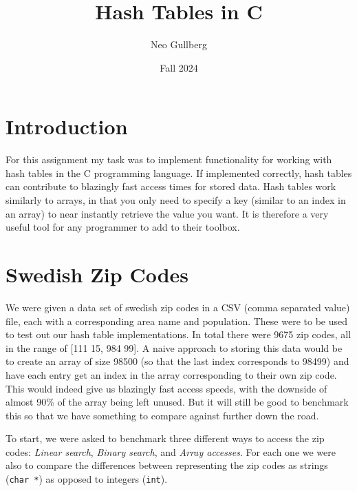 \documentclass[a4paper, 11pt]{article}
\begin{document}
\title{
	\textbf{Hash Tables in C}
}
\author{Neo Gullberg}
\date{Fall 2024}
\maketitle

\section{Introduction}
	For this assignment my task was to implement functionality for working with hash tables in the C programming language.
	If implemented correctly, hash tables can contribute to blazingly fast access times for stored data.
	Hash tables work similarly to arrays, in that you only need to specify a key (similar to an index in an array) to near instantly retrieve the value you want.
	It is therefore a very useful tool for any programmer to add to their toolbox.

\section{Swedish Zip Codes}
	We were given a data set of swedish zip codes in a CSV (comma separated value) file, each with a corresponding area name and population.
	These were to be used to test out our hash table implementations.
	In total there were 9675 zip codes, all in the range of [111 15, 984 99].
	A naive approach to storing this data would be to create an array of size 98500 (so that the last index corresponds to 98499)
	and have each entry get an index in the array corresponding to their own zip code.
	This would indeed give us blazingly fast access speeds, with the downside of almost 90\% of the array being left unused.
	But it will still be good to benchmark this so that we have something to compare against further down the road.
	\par
	To start, we were asked to benchmark three different ways to access the zip codes: \textit{Linear search}, \textit{Binary search}, and \textit{Array accesses}.
	For each one we were also to compare the differences between representing the zip codes as strings (\texttt{char *}) as opposed to integers (\texttt{int}).
\end{document}

